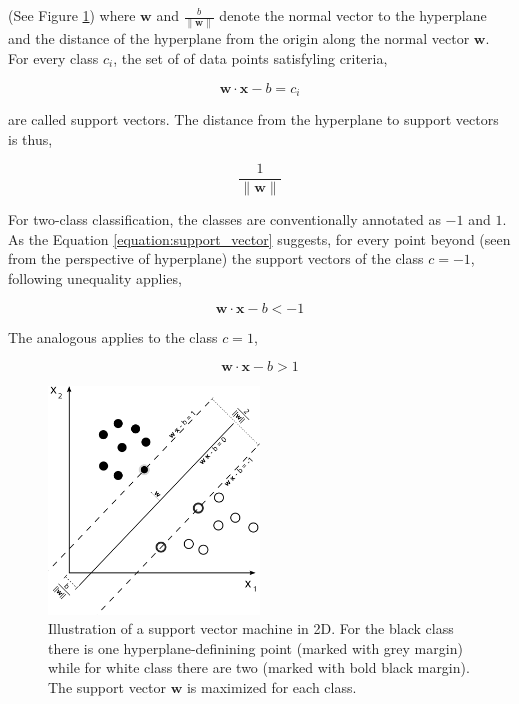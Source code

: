 \documentclass[pdftex,12pt,a4paper]{report}
\begin{document}
(See Figure \ref{fig:svm}) where $\mathbf{w}$ and $\frac{b}{\| \mathbf{w} \|}$ denote the normal vector to the hyperplane and the distance of the hyperplane from the origin along the normal vector $\mathbf{w}$. For every class $c_i$, the set of of data points satisfyling criteria,

\begin{equation}
\mathbf{w} \cdot \mathbf{x} - b = c_i
\label{equation:support_vector}
\end{equation}

are called support vectors. The distance from the hyperplane to support vectors is thus,

$$\frac{1}{\| \mathbf{w} \|}$$

For two-class classification, the classes are conventionally annotated as $-1$ and $1$. As the Equation \ref{equation:support_vector} suggests, for every point beyond (seen from the perspective of hyperplane) the support vectors of the class $c = -1$, following unequality applies,

\begin{equation}
\mathbf{w} \cdot \mathbf{x} - b < -1
\label{equation:svm_class_1}
\end{equation}

The analogous applies to the class $c = 1$,

\begin{equation}
\mathbf{w} \cdot \mathbf{x} - b > 1
\label{equation:svm_class_2}
\end{equation}

\begin{figure}[H]
\centering
\includegraphics[width=0.5\textwidth]{images/svm}
\caption[Illustration of SVM in 2D]{Illustration of a support vector machine in 2D. For the black class there is one hyperplane-definining point (marked with grey margin) while for white class there are two (marked with bold black margin). The support vector $\mathbf{w}$ is maximized for each class.}
\label{fig:svm}
\end{figure}
\end{document}
